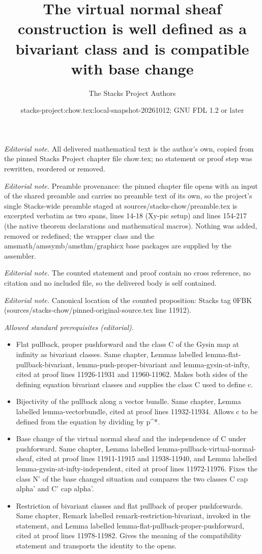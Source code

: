\documentclass[10pt,a4paper]{amsart}
\title{The virtual normal sheaf construction is well defined as a bivariant class and is compatible with base change}
\author{The Stacks Project Authors}
\date{stacks-project:chow.tex:local-snapshot-20261012; GNU FDL 1.2 or later}
\theoremstyle{plain}
\theoremstyle{definition}
\theoremstyle{remark}
\numberwithin{equation}{subsection}
\begin{document}
\maketitle
\noindent\textit{Editorial note.} All delivered mathematical text is the author's own, copied from the pinned Stacks Project chapter file chow.tex; no statement or proof step was rewritten, reordered or removed.\par\medskip
\noindent\textit{Editorial note.} Preamble provenance: the pinned chapter file opens with an input of the shared preamble and carries no preamble text of its own, so the project's single Stacks-wide preamble staged at sources/stacks-chow/preamble.tex is excerpted verbatim as two spans, lines 14-18 (Xy-pic setup) and lines 154-217 (the native theorem declarations and mathematical macros). Nothing was added, removed or redefined; the wrapper class and the amsmath/amssymb/amsthm/graphicx base packages are supplied by the assembler.\par\medskip
\noindent\textit{Editorial note.} The counted statement and proof contain no cross reference, no citation and no included file, so the delivered body is self contained.\par\medskip
\noindent\textit{Editorial note.} Canonical location of the counted proposition: Stacks tag 0FBK (sources/stacks-chow/pinned-original-source.tex line 11912).\par\medskip
\noindent\textit{Allowed standard prerequisites (editorial).}\begin{itemize}
\item Flat pullback, proper pushforward and the class C of the Gysin map at infinity as bivariant classes. Same chapter, Lemmas labelled lemma-flat-pullback-bivariant, lemma-push-proper-bivariant and lemma-gysin-at-infty, cited at proof lines 11926-11931 and 11960-11962. Makes both sides of the defining equation bivariant classes and supplies the class C used to define c.
\item Bijectivity of the pullback along a vector bundle. Same chapter, Lemma labelled lemma-vectorbundle, cited at proof lines 11932-11934. Allows c to be defined from the equation by dividing by p\textasciicircum{}*.
\item Base change of the virtual normal sheaf and the independence of C under pushforward. Same chapter, Lemma labelled lemma-pullback-virtual-normal-sheaf, cited at proof lines 11911-11915 and 11938-11940, and Lemma labelled lemma-gysin-at-infty-independent, cited at proof lines 11972-11976. Fixes the class N' of the base changed situation and compares the two classes C cap alpha' and C' cap alpha'.
\item Restriction of bivariant classes and flat pullback of proper pushforwards. Same chapter, Remark labelled remark-restriction-bivariant, invoked in the statement, and Lemma labelled lemma-flat-pullback-proper-pushforward, cited at proof lines 11978-11982. Gives the meaning of the compatibility statement and transports the identity to the opens.
\end{itemize}\medskip
\end{document}
